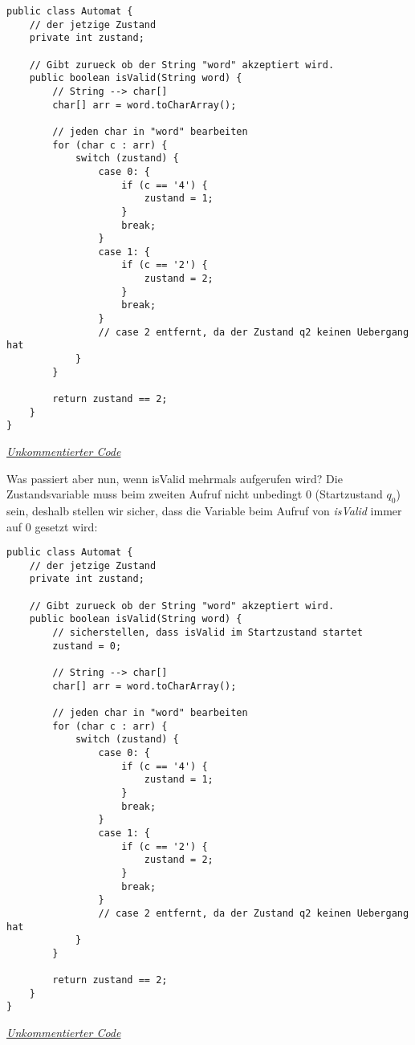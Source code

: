 \begin{center}
\begin{lstlisting}
public class Automat {
    // der jetzige Zustand
    private int zustand;

    // Gibt zurueck ob der String "word" akzeptiert wird.
    public boolean isValid(String word) {
        // String --> char[]
        char[] arr = word.toCharArray();

        // jeden char in "word" bearbeiten
        for (char c : arr) {
            switch (zustand) {
                case 0: {
                    if (c == '4') {
                        zustand = 1;
                    }
                    break;
                }
                case 1: {
                    if (c == '2') {
                        zustand = 2;
                    }
                    break;
                }
                // case 2 entfernt, da der Zustand q2 keinen Uebergang hat
            }
        }

        return zustand == 2;
    }
}
\end{lstlisting}
\href{https://raw.githubusercontent.com/tim-tm/articles/refs/heads/main/informatik-notes/code/Automat.java}{\textit{Unkommentierter Code}} \\
\end{center}

\begin{flushleft}
    Was passiert aber nun, wenn isValid mehrmals aufgerufen wird?
    Die Zustandsvariable muss beim zweiten Aufruf nicht unbedingt 0 (Startzustand $q_0$) sein,
    deshalb stellen wir sicher, dass die Variable beim Aufruf von \textit{isValid} immer auf 0 gesetzt wird:
\end{flushleft}

\begin{center}
\begin{lstlisting}
public class Automat {
    // der jetzige Zustand
    private int zustand;

    // Gibt zurueck ob der String "word" akzeptiert wird.
    public boolean isValid(String word) {
        // sicherstellen, dass isValid im Startzustand startet
        zustand = 0;

        // String --> char[]
        char[] arr = word.toCharArray();

        // jeden char in "word" bearbeiten
        for (char c : arr) {
            switch (zustand) {
                case 0: {
                    if (c == '4') {
                        zustand = 1;
                    }
                    break;
                }
                case 1: {
                    if (c == '2') {
                        zustand = 2;
                    }
                    break;
                }
                // case 2 entfernt, da der Zustand q2 keinen Uebergang hat
            }
        }

        return zustand == 2;
    }
}
\end{lstlisting}
\href{https://raw.githubusercontent.com/tim-tm/articles/refs/heads/main/informatik-notes/code/Automat.java}{\textit{Unkommentierter Code}} \\
\end{center}

